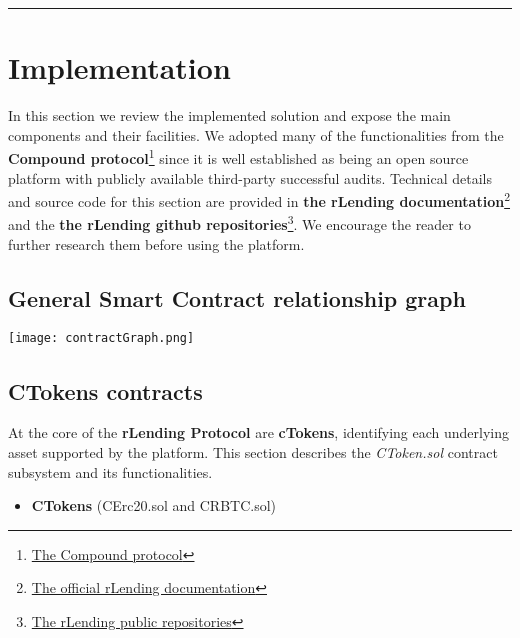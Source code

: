 \documentclass{article}
\begin{document}
\begin{center}
\noindent\rule{8cm}{0.4pt}
\end{center}

\section{Implementation}
In this section we review the implemented solution and expose the main components and their facilities. We adopted many of the functionalities from the \textbf{Compound protocol}\footnote{\href{https://github.com/compound-finance/compound-protocol}{The Compound protocol}} since it is well established as being an open source platform with publicly available third-party successful audits. Technical details and source code for this section are provided in \textbf{the rLending documentation}\footnote{\href{https://rlending.app/docs}{The official rLending documentation}} and the \textbf{the rLending github repositories}\footnote{\href{https://github.com/riflending/}{The rLending public repositories}}. We encourage the reader to further research them before using the platform.

\subsection{General Smart Contract relationship graph}
\begin{center}
\texttt{[image: contractGraph.png]}
\end{center}

\subsection{CTokens contracts}
At the core of the \textbf{rLending Protocol} are \textbf{cTokens}, identifying each underlying asset supported by the platform.
This section describes the \textit{CToken.sol} contract subsystem and its functionalities.

\begin{itemize}
\item{\textbf{CTokens}} (CErc20.sol and CRBTC.sol)
\end{itemize}
\end{document}
